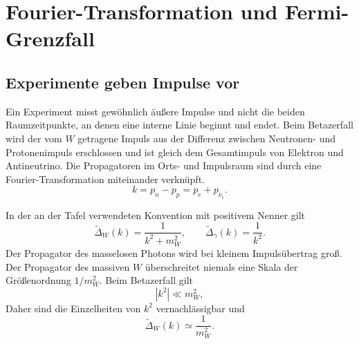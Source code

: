 \begin{classroomqa}
\end{classroomqa}

\section{Fourier-Transformation und Fermi-Grenzfall}

\subsection{Experimente geben Impulse vor}

Ein Experiment misst gewöhnlich äußere Impulse und nicht die beiden Raumzeitpunkte, an denen eine interne Linie beginnt und endet. Beim Betazerfall wird der vom \(W\) getragene Impuls aus der Differenz zwischen Neutronen- und Protonenimpuls erschlossen und ist gleich dem Gesamtimpuls von Elektron und Antineutrino. Die Propagatoren im Orts- und Impulsraum sind durch eine Fourier-Transformation miteinander verknüpft.
\begin{equation}
  k=p_n-p_p=p_e+p_{\bar\nu_e}.
\end{equation}

In der an der Tafel verwendeten Konvention mit positivem Nenner gilt
\begin{equation}
  \widetilde{\Delta}_W(k)=\frac1{k^2+m_W^2},
  \qquad
  \widetilde{\Delta}_\gamma(k)=\frac1{k^2}.
\end{equation}
Der Propagator des masselosen Photons wird bei kleinem Impulsübertrag groß. Der Propagator des massiven \(W\) überschreitet niemals eine Skala der Größenordnung \(1/m_W^2\). Beim Betazerfall gilt
\begin{equation}
  |k^2|\ll m_W^2,
\end{equation}
Daher sind die Einzelheiten von \(k^2\) vernachlässigbar und
\begin{equation}
  \widetilde{\Delta}_W(k)\simeq\frac1{m_W^2}.
\end{equation}

